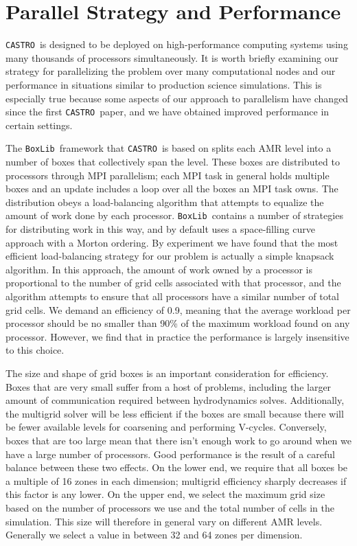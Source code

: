 \documentclass[iop]{../emulateapj}
\newcommand{\boxlib}{\texttt{BoxLib}}
\newcommand{\castro}{\texttt{CASTRO}}
\begin{document}
\section{Parallel Strategy and Performance}\label{sec:Performance}

\castro\ is designed to be deployed on high-performance computing systems using 
many thousands of processors simultaneously. It is worth briefly examining 
our strategy for parallelizing the problem over many computational nodes 
and our performance in situations similar to production science simulations. 
This is especially true because some aspects of our approach to parallelism 
have changed since the first \castro\ paper, and we have obtained improved 
performance in certain settings.

The \boxlib\ framework that \castro\ is based on splits each AMR level into a number 
of boxes that collectively span the level. These boxes are distributed to processors 
through MPI parallelism; each MPI task in general holds multiple boxes and 
an update includes a loop over all the boxes an MPI task owns. The distribution 
obeys a load-balancing algorithm that attempts to equalize the amount of work 
done by each processor. \boxlib\ contains a number of strategies for distributing 
work in this way, and by default uses a space-filling curve approach with a 
Morton ordering. By experiment we have found that the most efficient load-balancing 
strategy for our problem is actually a simple knapsack algorithm. In this approach, 
the amount of work owned by a processor is proportional to the number of grid cells 
associated with that processor, and the algorithm attempts to ensure that all 
processors have a similar number of total grid cells. We demand an efficiency of 0.9,
meaning that the average workload per processor should be no smaller than 90\% of the 
maximum workload found on any processor. However, we find that in practice the 
performance is largely insensitive to this choice.

The size and shape of grid boxes is an important consideration for efficiency. 
Boxes that are very small suffer from a host of problems, including the larger 
amount of communication required between hydrodynamics solves. Additionally, 
the multigrid solver will be less efficient if the boxes are small because there 
will be fewer available levels for coarsening and performing V-cycles. Conversely, 
boxes that are too large mean that there isn't enough work to go around when we 
have a large number of processors. Good performance is the result of a careful 
balance between these two effects. On the lower end, we require that all boxes 
be a multiple of 16 zones in each dimension; multigrid efficiency sharply decreases 
if this factor is any lower. On the upper end, we select the maximum grid size 
based on the number of processors we use and the total number of cells in the 
simulation. This size will therefore in general vary on different AMR levels. 
Generally we select a value in between 32 and 64 zones per dimension.
\end{document}
